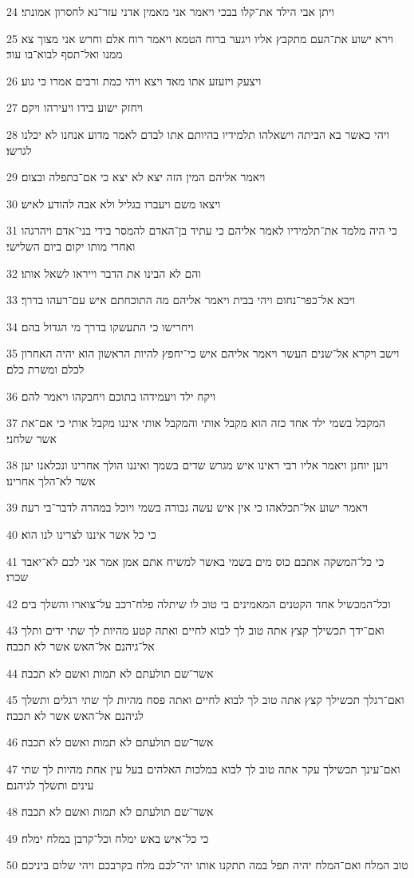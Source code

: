 \par 24 ויתן אבי הילד את־קלו בבכי ויאמר אני מאמין אדני עזר־נא לחסרון אמונתי׃
\par 25 וירא ישוע את־העם מתקבץ אליו ויגער ברוח הטמא ויאמר רוח אלם וחרש אני מצוך צא ממנו ואל־תסף לבוא־בו עוד׃
\par 26 ויצעק ויזעזע אתו מאד ויצא ויהי כמת ורבים אמרו כי גוע׃
\par 27 ויחזק ישוע בידו ויעירהו ויקם׃
\par 28 ויהי כאשר בא הביתה וישאלהו תלמידיו בהיותם אתו לבדם לאמר מדוע אנחנו לא יכלנו לגרשו׃
\par 29 ויאמר אליהם המין הזה יצא לא יצא כי אם־בתפלה ובצום׃
\par 30 ויצאו משם ויעברו בגליל ולא אבה להודע לאיש׃
\par 31 כי היה מלמד את־תלמידיו לאמר אליהם כי עתיד בן־האדם להמסר בידי בני־אדם ויהרגהו ואחרי מותו יקום ביום השלישי׃
\par 32 והם לא הבינו את הדבר וייראו לשאל אותו׃
\par 33 ויבא אל־כפר־נחום ויהי בבית ויאמר אליהם מה התוכחתם איש עם־רעהו בדרך׃
\par 34 ויחרישו כי התעשקו בדרך מי הגדול בהם׃
\par 35 וישב ויקרא אל־שנים העשר ויאמר אליהם איש כי־יחפץ להיות הראשון הוא יהיה האחרון לכלם ומשרת כלם׃
\par 36 ויקח ילד ויעמידהו בתוכם ויחבקהו ויאמר להם׃
\par 37 המקבל בשמי ילד אחד כזה הוא מקבל אותי והמקבל אותי איננו מקבל אותי כי אם־את אשר שלחני׃
\par 38 ויען יוחנן ויאמר אליו רבי ראינו איש מגרש שדים בשמך ואיננו הולך אחרינו ונכלאנו יען אשר לא־הלך אחרינו׃
\par 39 ויאמר ישוע אל־תכלאהו כי אין איש עשה גבורה בשמי ויוכל במהרה לדבר־בי רעה׃
\par 40 כי כל אשר איננו לצרינו לנו הוא׃
\par 41 כי כל־המשקה אתכם כוס מים בשמי באשר למשיח אתם אמן אמר אני לכם לא־יאבד שכרו׃
\par 42 וכל־המכשיל אחד הקטנים המאמינים בי טוב לו שיתלה פלח־רכב על־צוארו והשלך בים׃
\par 43 ואם־ידך תכשילך קצץ אתה טוב לך לבוא לחיים ואתה קטע מהיות לך שתי ידים ותלך אל־גיהנם אל־האש אשר לא תכבה׃
\par 44 אשר־שם תולעתם לא תמות ואשם לא תכבה׃
\par 45 ואם־רגלך תכשילך קצץ אתה טוב לך לבוא לחיים ואתה פסח מהיות לך שתי רגלים ותשלך לגיהנם אל־האש אשר לא תכבה׃
\par 46 אשר־שם תולעתם לא תמות ואשם לא תכבה׃
\par 47 ואם־עינך תכשילך עקר אתה טוב לך לבוא במלכות האלהים בעל עין אחת מהיות לך שתי עינים ותשלך לגיהנם׃
\par 48 אשר־שם תולעתם לא תמות ואשם לא תכבה׃
\par 49 כי כל־איש באש ימלח וכל־קרבן במלח ימלח׃
\par 50 טוב המלח ואם־המלח יהיה תפל במה תתקנו אותו יהי־לכם מלח בקרבכם ויהי שלום ביניכם׃

